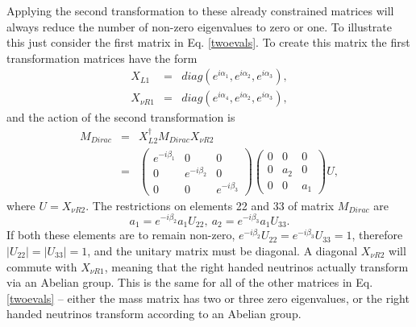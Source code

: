 \documentclass[nofootinbib,showpacs]{revtex4}
\begin{document}
Applying the second transformation to these already constrained matrices will always reduce the number of non-zero eigenvalues to zero or one. 
To illustrate this just consider the first matrix in Eq. \ref{twoevals}. 
To create this matrix the first transformation matrices have the form
\begin{eqnarray}
X_{L 1}&=&diag(e^{i \alpha_1},e^{i \alpha_2},e^{i \alpha_3}),\\
X_{\nu R 1}&=&diag(e^{i \alpha_4},e^{i \alpha_2},e^{i \alpha_3}),
\end{eqnarray} 
and the action of the second transformation is
\begin{eqnarray}
M_{Dirac}&=&X_{L 2}^\dagger M_{Dirac} X_{\nu R 2}\\
&=&\left(\begin{array}{ccc}e^{-i \beta_1}&0&0\\0&e^{-i \beta_2}&0\\0&0&e^{-i \beta_3}\end{array}\right)\left(\begin{array}{ccc}0&0&0\\0&a_2&0\\0&0&a_1\end{array}\right) U,
\end{eqnarray}
where $U=X_{\nu R 2}$.
The restrictions on elements 22 and 33 of matrix $M_{Dirac}$ are 
\begin{equation}
a_1=e^{-i \beta_2} a_1 U_{22}, \: a_2=e^{-i \beta_3} a_1 U_{33}.
\end{equation}
If both these elements are to remain non-zero, $e^{-i \beta_2} U_{22}=e^{-i \beta_3}U_{33}=1$, therefore $|U_{22}|=|U_{33}|=1$, and the unitary matrix must be diagonal. A diagonal $X_{\nu R 2}$ will commute with $X_{\nu R1}$, meaning that the right handed neutrinos actually transform via an Abelian group. 
This is the same for all of the other matrices in Eq. \ref{twoevals} --  either the mass matrix has two or three zero eigenvalues, or the right handed neutrinos transform according to an Abelian group. 
  


 
\end{document}
